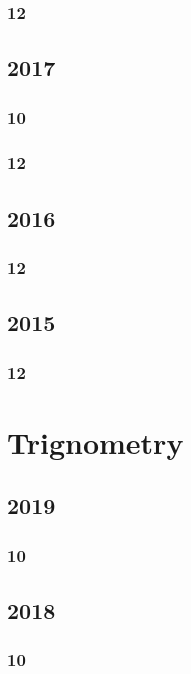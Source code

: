 \documentclass[11pt]{book}
\begin{document}
\subsection{12}




\section{2017}
\subsection{10}

\subsection{12}



\section{2016}
\subsection{12}


\section{2015}
\subsection{12}






\chapter{Trignometry}
\section{2019}
\subsection{10}

\section{2018}
\subsection{10}

\end{document}
